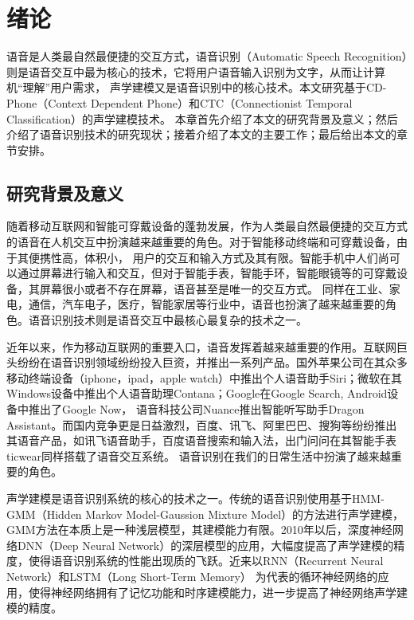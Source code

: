 \chapter{绪论}

语音是人类最自然最便捷的交互方式，语音识别（Automatic Speech Recognition）则是语音交互中最为核心的技术，它将用户语音输入识别为文字，从而让计算机“理解”用户需求，
声学建模又是语音识别中的核心技术。本文研究基于CD-Phone（Context Dependent Phone）和CTC（Connectionist  Temporal Classification）的声学建模技术。
本章首先介绍了本文的研究背景及意义；然后介绍了语音识别技术的研究现状；接着介绍了本文的主要工作；最后给出本文的章节安排。


\section{研究背景及意义}

随着移动互联网和智能可穿戴设备的蓬勃发展，作为人类最自然最便捷的交互方式的语音在人机交互中扮演越来越重要的角色。对于智能移动终端和可穿戴设备，由于其便携性高，体积小，
用户的交互和输入方式及其有限。智能手机中人们尚可以通过屏幕进行输入和交互，但对于智能手表，智能手环，智能眼镜等的可穿戴设备，其屏幕很小或者不存在屏幕，语音甚至是唯一的交互方式。
同样在工业、家电，通信，汽车电子，医疗，智能家居等行业中，语音也扮演了越来越重要的角色。语音识别技术则是语音交互中最核心最复杂的技术之一。

近年以来，作为移动互联网的重要入口，语音发挥着越来越重要的作用。互联网巨头纷纷在语音识别领域纷纷投入巨资，并推出一系列产品。国外苹果公司在其众多移动终端设备（iphone，ipad，apple watch）中推出个人语音助手Siri；微软在其Windows设备中推出个人语音助理Contana；Google在Google Search, Android设备中推出了Google Now， 语音科技公司Nuance推出智能听写助手Dragon Assistant。而国内竞争更是日益激烈，百度、讯飞、阿里巴巴、搜狗等纷纷推出其语音产品，如讯飞语音助手，百度语音搜索和输入法，出门问问在其智能手表ticwear同样搭载了语音交互系统。
语音识别在我们的日常生活中扮演了越来越重要的角色。

声学建模是语音识别系统的核心的技术之一。传统的语音识别使用基于HMM-GMM（Hidden Markov Model-Gaussion Mixture Model）的方法进行声学建模，GMM方法在本质上是一种浅层模型，其建模能力有限。2010年以后，深度神经网络DNN（Deep Neural Network）的深层模型的应用，大幅度提高了声学建模的精度，使得语音识别系统的性能出现质的飞跃。近来以RNN（Recurrent Neural Network）和LSTM（Long Short-Term Memory）
为代表的循环神经网络的应用，使得神经网络拥有了记忆功能和时序建模能力，进一步提高了神经网络声学建模的精度。

